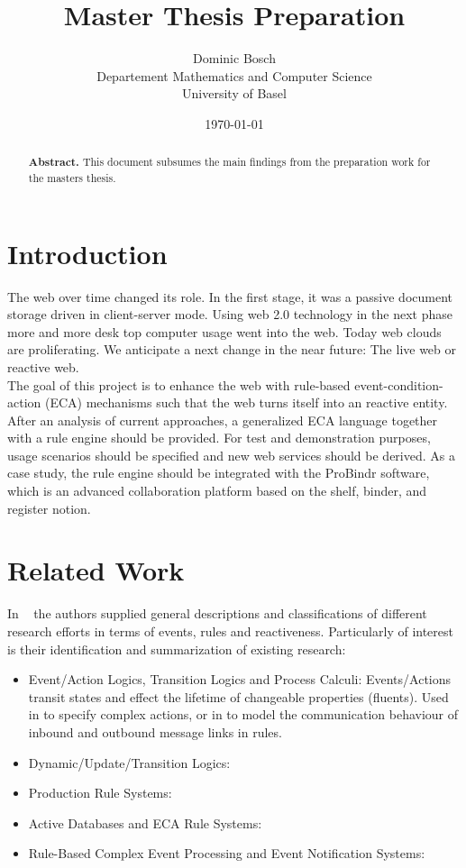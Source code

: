 \documentclass[11pt,twocolumn]{article}
\begin{document}
\title{Master Thesis Preparation}
\date{\today}
\author{Dominic Bosch \\ Departement Mathematics and Computer Science \\ University of Basel}

\maketitle
\renewcommand{\abstractname}{}
\begin{abstract}
\textbf{Abstract.} This document subsumes the main findings from the preparation work for the masters thesis.
\end{abstract}

\section{Introduction}
The web over time changed its role. In the first stage, it was a passive document storage driven in client-server mode. Using web 2.0 technology in the next phase more and more desk top computer usage went into the web. Today web clouds are proliferating. We anticipate a next change in the near future: The live web or reactive web.
\\
The goal of this project is to enhance the web with rule-based event-condition-action (ECA) mechanisms  such that the web turns itself into an reactive entity. After an analysis of current approaches, a generalized ECA language together with a rule engine should be provided. For test and demonstration purposes, usage scenarios should be specified and new web services should be derived. As a case study, the rule engine should be integrated with the ProBindr software, which is an advanced collaboration platform based on the shelf, binder, and register notion.

\section{Related Work}
In ~\cite{2009-Paschke_Boley-RCER.pdf} the authors supplied general descriptions and classifications of different research efforts in terms of events, rules and reactiveness. Particularly of interest is their identification and summarization of existing research:
 \begin{itemize}
\itemsep-1.5em
  \item Event/Action Logics, Transition Logics and Process Calculi: Events/Actions transit states and effect the lifetime of changeable properties (fluents). Used in \cite{Behrends:2008:EEA:1377798.1377801} to specify complex actions, or in to model the communication behaviour of inbound and outbound message links in rules.
  \item Dynamic/Update/Transition Logics: 
  \item Production Rule Systems:
  \item Active Databases and ECA Rule Systems:
  \item Rule-Based Complex Event Processing and Event Notification Systems: 
\end{itemize}
\end{document}
